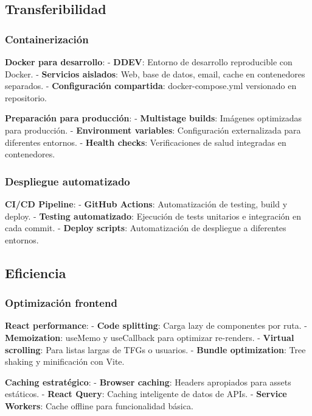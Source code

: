 \documentclass[12pt,a4paper,oneside]{report}
\begin{document}
\subsection{Transferibilidad}\label{transferibilidad}

\subsubsection{Containerización}\label{containerizaciuxf3n}

\textbf{Docker para desarrollo}: - \textbf{DDEV}: Entorno de desarrollo
reproducible con Docker. - \textbf{Servicios aislados}: Web, base de
datos, email, cache en contenedores separados. - \textbf{Configuración
compartida}: docker-compose.yml versionado en repositorio.

\textbf{Preparación para producción}: - \textbf{Multistage builds}:
Imágenes optimizadas para producción. - \textbf{Environment variables}:
Configuración externalizada para diferentes entornos. - \textbf{Health
checks}: Verificaciones de salud integradas en contenedores.

\subsubsection{Despliegue automatizado}\label{despliegue-automatizado}

\textbf{CI/CD Pipeline}: - \textbf{GitHub Actions}: Automatización de
testing, build y deploy. - \textbf{Testing automatizado}: Ejecución de
tests unitarios e integración en cada commit. - \textbf{Deploy scripts}:
Automatización de despliegue a diferentes entornos.

\subsection{Eficiencia}\label{eficiencia}

\subsubsection{Optimización frontend}\label{optimizaciuxf3n-frontend}

\textbf{React performance}: - \textbf{Code splitting}: Carga lazy de
componentes por ruta. - \textbf{Memoization}: useMemo y useCallback para
optimizar re-renders. - \textbf{Virtual scrolling}: Para listas largas
de TFGs o usuarios. - \textbf{Bundle optimization}: Tree shaking y
minificación con Vite.

\textbf{Caching estratégico}: - \textbf{Browser caching}: Headers
apropiados para assets estáticos. - \textbf{React Query}: Caching
inteligente de datos de APIs. - \textbf{Service Workers}: Cache offline
para funcionalidad básica.
\end{document}
